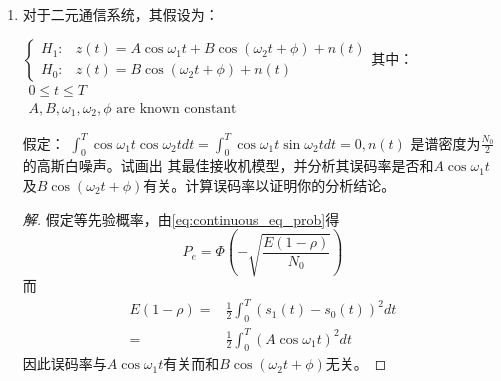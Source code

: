 \documentclass{article}
\begin{document}
\begin{enumerate}
\begin{enumerate}[label=(\arabic*)]
\begin{proof}[解]
\begin{enumerate}[label=(\alph*)]
\item 
\begin{align*}
\bar{R} = & C_{01} P(D_0,H_1) + C_{10} P(D_1,H_0) \\
         = & 2 P(H_1) P(D_0 | H_1) + P(H_0) P(D_1 | H_0) \\
         = & 0.6 P_M + 0.7 P_F
\end{align*}
另一方面，
$$
\lambda_B = \frac{P(H_0)(C_{10}-C_{00})}{P(H_1)(C_{01}-C_{11})} = \frac{7}{6}
$$
根据(a)
$\bar{R}(K=1)=0.47,\bar{R}(K=6)=0.25,\bar{R}(K=7)=0.23 < \frac{1}{2}\bar{R}(K=1) \Rightarrow N=7$
\end{enumerate}
\end{proof}
\item 对于二元通信系统，其假设为：

$
\begin{cases}
H_1 : & z(t) = A\cos\omega_1 t + B \cos(\omega_2 t +\phi) + n(t)\\
H_0 : & z(t) = B\cos(\omega_2 t + \phi) + n(t)
\end{cases}
$其中：$\begin{array}{c}
0\leq t \leq T \\
A,B,\omega_1,\omega_2,\phi \textrm{ are known constant}
\end{array}$

假定： $\int_0^T \cos\omega_1 t \cos\omega_2 t dt = \int_0^T \cos\omega_1 t \sin\omega_2 t dt = 0, n(t)$ 是谱密度为$\frac{N_0}{2}$的高斯白噪声。试画出
其最佳接收机模型，并分析其误码率是否和$A\cos\omega_1 t $及$B\cos(\omega_2 t + \phi)$有关。计算误码率以证明你的分析结论。
\begin{proof}[解]
假定等先验概率，由\eqref{eq:continuous_eq_prob}得 
$$
P_e = \Phi(-\sqrt{\frac{E(1-\rho)}{N_0}})
$$
而
\begin{align*}
E(1-\rho) = & \frac{1}{2} \int_0^T (s_1(t)-s_0(t))^2 dt \\
          = &  \frac{1}{2} \int_0^T (A\cos\omega_1 t)^2 dt 
\end{align*}
因此误码率与$A\cos\omega_1 t$有关而和$B\cos(\omega_2 t + \phi)$无关。
\end{proof}
\end{enumerate}
\end{enumerate}
\end{document}
